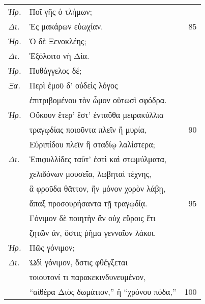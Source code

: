 \documentclass[13pt]{article}
\begin{document}
\begin{greek}
\begin{spacing}{1.5}
\begin{tabularx}{\textwidth}{@{}lXr@{}}
  \textit{Ἡρ.} & Ποῖ γῆς ὁ τλήμων; & \\
  \textit{Δι.} & \hspace*{8em}Ἐς μακάρων εὐωχίαν. & 85 \\
  \textit{Ἡρ.} & Ὁ δὲ Ξενοκλέης; & \\
  \textit{Δι.} & \hspace*{7em}Ἐξόλοιτο νὴ Δία. & \\
  \textit{Ἡρ.} & Πυθάγγελος δέ; & \\
  \textit{Ξα.} & \hspace*{7em}Περὶ ἐμοῦ δ' οὐδεὶς λόγος & \\
  & ἐπιτριβομένου τὸν ὦμον οὑτωσὶ σφόδρα. & \\
  \textit{Ἡρ.} & Οὔκουν ἕτερ' ἔστ' ἐνταῦθα μειρακύλλια & \\
  & τραγῳδίας ποιοῦντα πλεῖν ἢ μυρία, & 90 \\
  & Εὐριπίδου πλεῖν ἢ σταδίῳ λαλίστερα; & \\
  \textit{Δι.} & Ἐπιφυλλίδες ταῦτ' ἐστὶ καὶ στωμύλματα, & \\
  & χελιδόνων μουσεῖα, λωβηταὶ τέχνης, & \\
  & ἃ φροῦδα θᾶττον, ἢν μόνον χορὸν λάβῃ, & \\
  & ἅπαξ προσουρήσαντα τῇ τραγῳδίᾳ. & 95 \\
  & Γόνιμον δὲ ποιητὴν ἂν οὐχ εὕροις ἔτι & \\
  & ζητῶν ἄν, ὅστις ῥῆμα γενναῖον λάκοι. & \\
  \textit{Ἡρ.} & Πῶς γόνιμον; & \\
  \textit{Δι.} & \hspace*{6em}Ὡδὶ γόνιμον, ὅστις φθέγξεται & \\
  & τοιουτονί τι παρακεκινδυνευμένον, & \\
  & “αἰθέρα Διὸς δωμάτιον,” ἢ “χρόνου πόδα,” & 100 \\

\end{tabularx}

\end{spacing}

\newpage


\end{greek}
\end{document}
